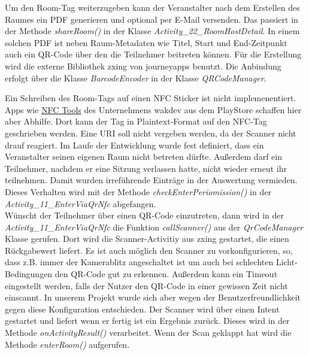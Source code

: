 Um den Room-Tag weiterzugeben kann der Veranstalter nach dem Erstellen des Raumes ein PDF generieren und optional per E-Mail versenden. 
Das passiert in der Methode \textit{shareRoom()} in der Klasse \textit{Activity\_22\_RoomHostDetail}. 
In einem solchen PDF ist neben Raum-Metadaten wie Titel, Start und End-Zeitpunkt auch ein QR-Code über den die Teilnehmer beitreten können. 
Für die Erstellung wird die externe Bibliothek zxing von journeyapps benutzt. Die Anbindung erfolgt über die Klasse \textit{BarcodeEncoder} in der Klasse \textit{QRCodeManager}.

Ein Schreiben des Room-Tags auf einen NFC Sticker ist nicht implemenentiert.
 Apps wie \href{https://play.google.com/store/apps/details?id=com.wakdev.wdnfc&hl=de&gl=US}{NFC Tools} des Unternehmens wakdev aus dem PlayStore schaffen hier aber Abhilfe. 
Dort kann der Tag in Plaintext-Format auf den NFC-Tag geschrieben werden.
Eine URI soll nicht vergeben werden, da der Scanner nicht drauf reagiert.
Im Laufe der Entwicklung  wurde fest definiert, dass ein Veranstalter seinen eigenen Raum nicht betreten dürfte.
Außerdem darf ein Teilnehmer, nachdem er eine Sitzung verlassen hatte, nicht wieder erneut ihr teilnehmen.
Damit wurden irreführende Einträge in der Auswertung vermieden. Dieses Verhalten wird mit der Methode \textit{checkEnterPeriomission()} in der \textit{Activity\_11\_EnterViaQrNfc} abgefangen.
\\ 
Wünscht der Teilnehmer über einen QR-Code einzutreten, dann wird in der \textit{Activity\_11\_EnterViaQrNfc} die Funktion \textit{callScanner()} aus der \textit{QrCodeManager} Klasse gerufen. 
Dort wird die Scanner-Activitiy aus zxing gestartet, die einen Rückgabewert liefert. 
Es ist auch möglich den Scanner zu vorkonfigurieren, so, dass z.B. immer der Kamerablitz angeschaltet ist um auch bei schlechten Licht-Bedingungen den QR-Code gut zu erkennen. 
Außerdem kann ein Timeout eingestellt werden, falls der Nutzer den QR-Code in einer gewissen Zeit nicht einscannt.
In unserem Projekt wurde sich aber wegen der Benutzerfreundlichkeit gegen diese Konfiguration entschieden.
Der Scanner wird über einen Intent gestartet und liefert wenn er fertig ist ein Ergebnis zurück.
Dieses wird in der Methode \textit{onActivityResult()} verarbeitet. Wenn der Scan geklappt hat wird die Methode \textit{enterRoom()} aufgerufen. 
